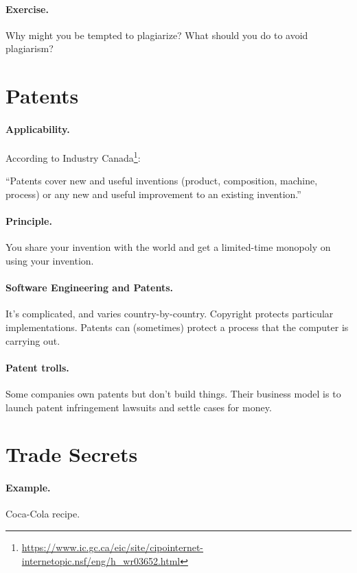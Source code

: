 \documentclass[11pt]{article}
\begin{document}
\paragraph{Exercise.} Why might you be tempted to plagiarize? What should you do to avoid plagiarism?

\section*{Patents}

\paragraph{Applicability.} According to Industry Canada\footnote{\url{https://www.ic.gc.ca/eic/site/cipointernet-internetopic.nsf/eng/h_wr03652.html}}:

\noindent
``Patents cover new and useful inventions (product, composition, machine, process) or any new and useful improvement to an existing invention.''

\paragraph{Principle.} You share your invention with the world and get a limited-time monopoly on using your invention.

\paragraph{Software Engineering and Patents.} It's complicated, and varies country-by-country. Copyright protects particular implementations. Patents can (sometimes) protect a process that the computer is carrying out.

\paragraph{Patent trolls.} Some companies own patents but don't build things. Their business model
is to launch patent infringement lawsuits and settle cases for money.

\section*{Trade Secrets}
\paragraph{Example.} Coca-Cola recipe.
\end{document}
